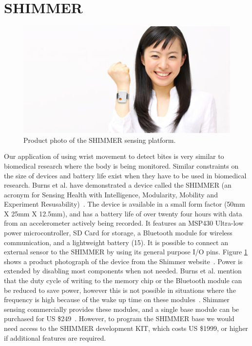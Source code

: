 \section{SHIMMER}
\label{Sec:Shimmer}
\begin{figure}
\begin{center}
\includegraphics{images/shimmerphoto.jpg}
\caption{Product photo of the SHIMMER sensing platform.}
\label{Fig:ShimmerHand}
\end{center}
\end{figure}
Our application of using wrist movement to detect bites is very similar to biomedical research where the body is being monitored.
Similar constraints on the size of devices and battery life exist when they have to be used in biomedical research.
Burns et al. have demonstrated a device called the SHIMMER
(an acronym for Sensing Health with Intelligence, Modularity, Mobility and Experiment Resusability)~\cite{burns2010shimmer}.
The device is available in a small form factor (50mm X 25mm X 12.5mm),
and has a battery life of over twenty four hours with data from an accelerometer actively being recorded.
It features an MSP430 Ultra-low power microcontroller,
SD Card for storage,
a Bluetooth module for wireless communication,
and a lightweight battery (15).
It is possible to connect an external sensor to the SHIMMER by using its general purpose I/O pins.
Figure \ref{Fig:ShimmerHand} shows a product photograph of the device from the Shimmer website~\cite{Web:ShimmerBuyKit}.
Power is extended by disabling most components when not needed.
Burns et al. mention that the duty cycle of writing to the memory chip or the Bluetooth module can be reduced to save power,
however this is not possible in situations where the frequency is high because of the wake up time on these modules~\cite{burns2010shimmer}.
Shimmer sensing commercially provides these modules,
and a single base module can be purchased for US \$249~\cite{Web:ShimmerBuy}.
However, to program the SHIMMER base we would need access to the SHIMMER development KIT,
which costs US \$1999, or higher if additional features are required.

